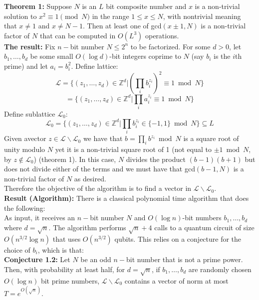 \documentclass{article}
\begin{document}
\textbf{Theorem 1:} Suppose $N$ is an $L$ bit composite number and $x$ is a non-trivial solution to $x^2 \equiv 1 \pmod N$ in the range $1\leq x \leq N$, with nontrivial meaning that $x \neq 1$ and $x \neq N-1$. Then at least one of gcd$(x\pm1, N)$ is a non-trivial factor of $N$ that can be computed in $O(L^3)$ operations.\\
\textbf{The result:} Fix $n-$bit number $N \leq 2^n$ to be factorized. For some $d>0$, let $b_1, \dots, b_d$ be some small $O(\log d)$-bit integers coprime to $N$ (say $b_i$ is the $i$th prime) and let $a_i = b_i^2$. Define lattice:
$$\mathcal{L} = \{ (z_1, \dots, z_d) \in \mathbb{Z}^d | (\prod_i b_i^{z_i})^2 \equiv 1 \bmod N\}$$
$$=\{(z_1, \dots, z_d) \in \mathbb{Z}^d | \prod_i a_i^{z_i} \equiv 1 \bmod N\}$$
Define sublattice $\mathcal{L}_0$:
$$\mathcal{L}_0 = \{ (z_1, \dots, z_d) \in \mathbb{Z}^d | \prod_i b_i^{z_i} \in \{-1, 1\} \bmod N \} \subseteq L$$
Given avector $z \in \mathcal{L} \backslash \mathcal{L}_0$ we have that $b = \prod_i b^{z_i} \bmod N$ is a square root of unity modulo $N$ yet it is a non-trivial square root of 1 (not equal to $\pm 1 \bmod N$, by $z \not \in \mathcal{L}_0$) (theorem 1).
In this case, $N$ divides the product $(b-1)(b+1)$ but does not divide either of the terms and we must have that gcd$(b-1, N)$ is a non-trivial factor of $N$ as desired. \\Therefore the objective of the algorithm is to find a vector in $\mathcal{L} \backslash \mathcal{L}_0$. \\ 
\textbf{Result (Algorithm):} There is a classical polynomial time algorithm that does the following: \\
As input, it receives an $n-$bit number $N$ and $O(\log n)$-bit numbers $b_1, \dots, b_d$ where $d= \sqrt{n}$. The algorithm performs $\sqrt{n} + 4$ calls to a quantum circuit of size $O(n^{3/2} \log n)$ that uses $O(n^{3/2})$ qubits.
This relies on a conjecture for the choice of $b_i$, which is that:\\
\textbf{Conjecture 1.2:} Let $N$ be an odd $n-$bit number that is not a prime power. Then, with probability at least half, for $d = \sqrt{n}$, if $b_1, \dots, b_d$ are randomly chosen $O(\log n)$ bit prime numbers, $\mathcal{L}\backslash \mathcal{L}_0$ contains a vector of norm at most  $T = e^{O(\sqrt{n})}$.
\end{document}
